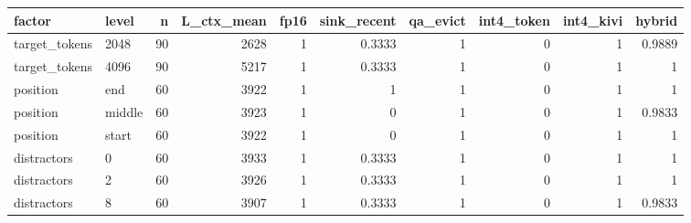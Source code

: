 \begin{table}
\label{tab:task2c_kv_breakdown}
\begin{tabular}{llrrrrrrrr}
\toprule
factor & level & n & L\_ctx\_mean & fp16 & sink\_recent & qa\_evict & int4\_token & int4\_kivi & hybrid \\
\midrule
target\_tokens & 2048 & 90 & 2628 & 1 & 0.3333 & 1 & 0 & 1 & 0.9889 \\
target\_tokens & 4096 & 90 & 5217 & 1 & 0.3333 & 1 & 0 & 1 & 1 \\
position & end & 60 & 3922 & 1 & 1 & 1 & 0 & 1 & 1 \\
position & middle & 60 & 3923 & 1 & 0 & 1 & 0 & 1 & 0.9833 \\
position & start & 60 & 3922 & 1 & 0 & 1 & 0 & 1 & 1 \\
distractors & 0 & 60 & 3933 & 1 & 0.3333 & 1 & 0 & 1 & 1 \\
distractors & 2 & 60 & 3926 & 1 & 0.3333 & 1 & 0 & 1 & 1 \\
distractors & 8 & 60 & 3907 & 1 & 0.3333 & 1 & 0 & 1 & 0.9833 \\
\bottomrule
\end{tabular}
\end{table}

